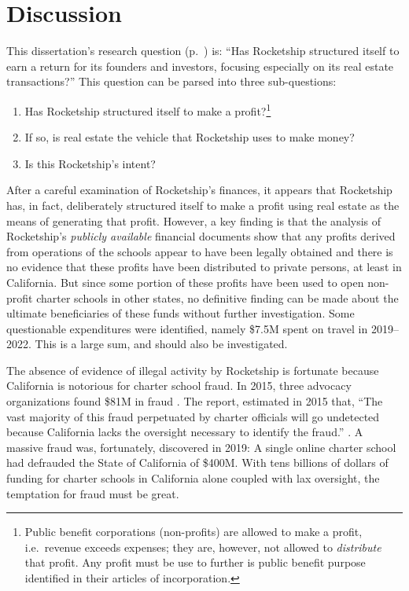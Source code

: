 
\chapter{Discussion}\label{ch:discussion}
This dissertation's research question (p.~\pageref{sec:research-question}) is: ``Has Rocketship structured itself to earn a return for its founders and investors, focusing especially on its real estate transactions?'' This question can be parsed into three sub-questions:
\begin{enumerate}
  \item Has Rocketship structured itself to make a profit?\footnote{Public benefit corporations (non-profits) are allowed to make a profit, i.e.\ revenue exceeds expenses; they are, however, not allowed to \textit{distribute} that profit. Any profit must be use to further is public benefit purpose identified in their articles of incorporation.}
  \item If so, is real estate the vehicle that Rocketship uses to make money?
  \item Is this Rocketship's intent?
\end{enumerate}

%
After a careful examination of Rocketship's finances, it appears that Rocketship has, in fact, deliberately structured itself to make a profit using real estate as the means of generating that profit. However, a key finding is that the analysis of Rocketship's \textit{publicly available} financial documents show that any profits derived from operations of the schools appear to have been legally obtained and there is no evidence that these profits have been distributed to private persons, at least in California. But since some portion of these profits have been used to open non-profit charter schools in other states, no definitive finding can be made about the ultimate beneficiaries of these funds without further investigation. Some questionable expenditures were identified, namely \$7.5M spent on travel in 2019–2022. This is a large sum, and should also be investigated.%

The absence of evidence of illegal activity by Rocketship is fortunate because California is notorious for charter school fraud. In 2015, three advocacy organizations found \$81M in fraud \citeauthor{CPD2015.etal}. The report,  estimated in 2015 that, ``The vast majority of this fraud perpetuated by charter officials will go undetected because California lacks the oversight necessary to identify the fraud.'' \parencite[2]{CPD2015.etal}. A massive fraud was, fortunately, discovered in 2019: A single online charter school had defrauded the State of California of \$400M. With tens billions of dollars of funding for charter schools in California alone coupled with lax oversight, the temptation for fraud must be great. 

